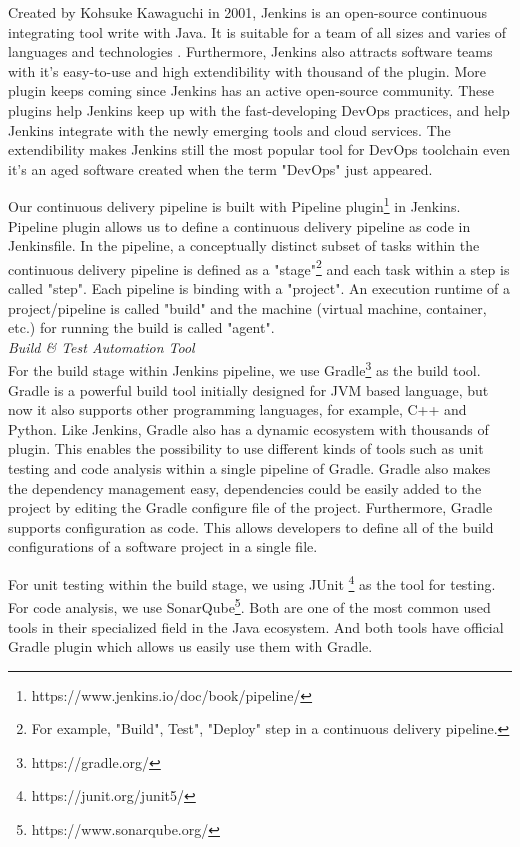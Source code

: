 \par
Created by Kohsuke Kawaguchi in 2001, Jenkins is an open-source continuous integrating tool write with Java.  It is suitable for a team of all sizes and varies of languages and technologies \cite{smart2011jenkins}. Furthermore, Jenkins also attracts software teams with it's easy-to-use and high extendibility \cite{smart2011jenkins} with thousand of the plugin. More plugin keeps coming since Jenkins has an active open-source community. These plugins help Jenkins keep up with the fast-developing DevOps practices, and help Jenkins integrate with the newly emerging tools and cloud services. The extendibility makes Jenkins still the most popular tool for DevOps toolchain even it's an aged software created when the term "DevOps" just appeared.
\par
Our continuous delivery pipeline is built with Pipeline plugin\footnote{https://www.jenkins.io/doc/book/pipeline/} in Jenkins. 
Pipeline plugin allows us to define a continuous delivery pipeline as code in Jenkinsfile.
In the pipeline, a conceptually distinct subset of tasks within the continuous delivery pipeline \cite{Pipeline85:online} is defined as a "stage"\footnote{For example, "Build", Test", "Deploy" step in a continuous delivery pipeline.} and each task within a step is called "step". Each pipeline is binding with a "project". An execution runtime of a project/pipeline is called "build" and the machine (virtual machine, container, etc.) for running the build is called "agent".
\medskip
\\
\textit{Build \& Test Automation Tool}\\
For the build stage within Jenkins pipeline, we use Gradle\footnote{https://gradle.org/} as the build tool. 
Gradle is a powerful build tool initially designed for JVM based language, but now it also supports other programming languages, for example, C++ and Python. Like Jenkins, Gradle also has a dynamic ecosystem with thousands of plugin. This enables the possibility to use different kinds of tools such as unit testing and code analysis within a single pipeline of Gradle. Gradle also makes the dependency management easy, dependencies could be easily added to the project by editing the Gradle configure file of the project. Furthermore, Gradle supports configuration as code. This allows developers to define all of the build configurations of a software project in a single file.
\par
For unit testing within the build stage, we using JUnit \footnote{https://junit.org/junit5/} as the tool for testing. For code analysis, we use SonarQube\footnote{https://www.sonarqube.org/}. Both are one of the most common used tools in their specialized field in the Java ecosystem. And both tools have official Gradle plugin which allows us easily use them with Gradle. 
